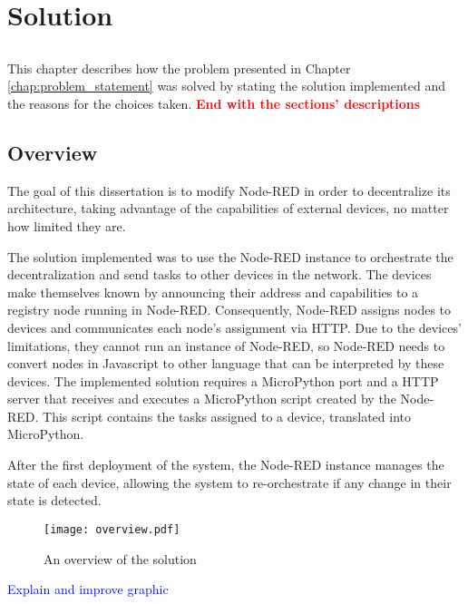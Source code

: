 \chapter{Solution} \label{chap:solution} \minitoc

\section*{}

This chapter describes how the problem presented in Chapter \ref{chap:problem_statement} was solved by stating the solution implemented and the reasons for the choices taken.  \textbf{\textcolor{red}{End with the sections' descriptions}}

\section{Overview}\label{sec:solution_overview}

The goal of this dissertation is to modify Node-RED in order to decentralize its architecture, taking advantage of the capabilities of external devices, no matter how limited they are.

The solution implemented was to use the Node-RED instance to orchestrate the decentralization and send tasks to other devices in the network. The devices make themselves known by announcing their address and capabilities to a registry node running in Node-RED. Consequently, Node-RED assigns nodes to devices and communicates each node's assignment via HTTP. Due to the devices' limitations, they cannot run an instance of Node-RED, so Node-RED needs to convert nodes in Javascript to other language that can be interpreted by these devices. The implemented solution requires a MicroPython port and a HTTP server that receives and executes a MicroPython script created by the Node-RED. This script contains the tasks assigned to a device, translated into MicroPython. 

After the first deployment of the system, the Node-RED instance manages the state of each device, allowing the system to re-orchestrate if any change in their state is detected.

\begin{figure}[h]
\centering
\texttt{[image: overview.pdf]}
\caption[Solution's overview]{An overview of the solution}\label{fig:solution_overview}
\end{figure}

\textcolor{blue}{Explain and improve graphic}


